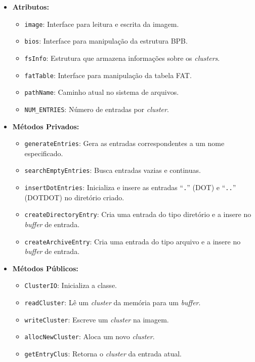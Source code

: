 \documentclass[
    12pt,				%
    oneside,   	        %
    a4paper,			%
    english,			%
    french,				%
    spanish,			%
    brazil,				%
    ]{pacotes/abntex2}
\begin{document}
\begin{itemize}
    \item \textbf{Atributos:}
        \begin{itemize}
            \item \texttt{image}: Interface para leitura e escrita da imagem.
            \item \texttt{bios}: Interface para manipulação da estrutura BPB.
            \item \texttt{fsInfo}: Estrutura que armazena informações sobre os \textit{clusters}.
            \item \texttt{fatTable}: Interface para manipulação da tabela FAT.
            \item \texttt{pathName}: Caminho atual no sistema de arquivos.
            \item \texttt{NUM\_ENTRIES}: Número de entradas por \textit{cluster}.
        \end{itemize}
    \item \textbf{Métodos Privados:}
        \begin{itemize}
            \item \texttt{generateEntries}: Gera as entradas correspondentes a um nome especificado.
            \item \texttt{searchEmptyEntries}: Busca entradas vazias e continuas.
            \item \texttt{insertDotEntries}: Inicializa e insere as entradas ``\texttt{.}'' (DOT) e ``\texttt{..}'' (DOTDOT) no diretório criado.
            \item \texttt{createDirectoryEntry}: Cria uma entrada do tipo diretório e a insere no \textit{buffer} de entrada.
            \item \texttt{createArchiveEntry}: Cria uma entrada do tipo arquivo e a insere no \textit{buffer} de entrada.
        \end{itemize}
    \item \textbf{Métodos Públicos:}
        \begin{itemize}
            \item \texttt{ClusterIO}: Inicializa a classe.
            \item \texttt{readCluster}: Lê um \textit{cluster} da memória para um \textit{buffer}.
            \item \texttt{writeCluster}: Escreve um \textit{cluster} na imagem.
            \item \texttt{allocNewCluster}: Aloca um novo \textit{cluster}.
            \item \texttt{getEntryClus}: Retorna o \textit{cluster} da entrada atual.

\end{itemize}
\end{itemize}
\end{document}
